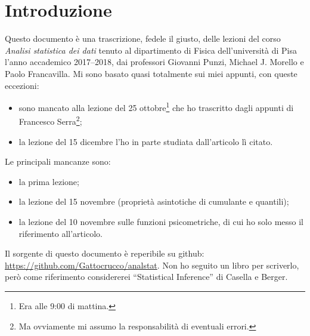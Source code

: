 
\chapter*{Introduzione}

Questo documento è una trascrizione, fedele il giusto,
delle lezioni del corso \emph{Analisi statistica dei dati}
tenuto al dipartimento di Fisica dell'università di Pisa
l'anno accademico 2017--2018,
dai professori Giovanni Punzi, Michael J. Morello e Paolo Francavilla.
Mi sono basato quasi totalmente sui miei appunti,
con queste eccezioni:
\begin{itemize}
	\item sono mancato alla lezione del 25 ottobre\footnote{Era alle 9:00 di mattina.} che ho trascritto dagli appunti di Francesco Serra\footnote{Ma ovviamente mi assumo la responsabilità di eventuali errori.};
	\item la lezione del 15 dicembre l'ho in parte studiata dall'articolo lì citato.
\end{itemize}
Le principali mancanze sono:
\begin{itemize}
	\item la prima lezione;
	\item la lezione del 15 novembre (proprietà asintotiche di cumulante e quantili);
	\item la lezione del 10 novembre sulle funzioni psicometriche,
	di cui ho solo messo il riferimento all'articolo. 
\end{itemize}
Il sorgente di questo documento è reperibile su github:
\url{https://github.com/Gattocrucco/analstat}. Non ho seguito un libro per
scriverlo, però come riferimento considererei ``Statistical Inference'' di
Casella e Berger.

